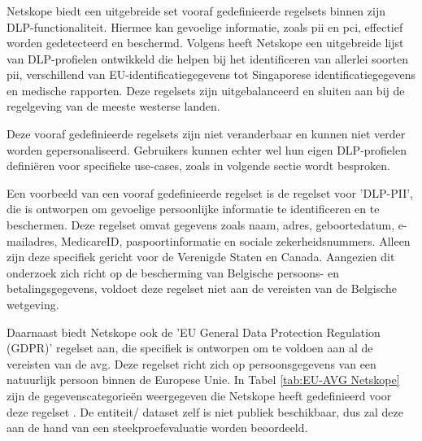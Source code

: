\subsubsection{}
\label{subsubsec:vooraf-gedefinieerde-regels-literatuurstudie}

Netskope biedt een uitgebreide set vooraf gedefinieerde regelsets binnen zijn DLP-functionaliteit. 
Hiermee kan gevoelige informatie, zoals \gls{pii} en \gls{pci}, effectief worden gedetecteerd en beschermd.
Volgens \textcite{brouwer2021cloud} heeft Netskope een uitgebreide lijst van DLP-profielen ontwikkeld die helpen bij het identificeren van allerlei soorten \gls{pii},
verschillend van EU-identificatiegegevens tot Singaporese identificatiegegevens en medische rapporten. 
Deze regelsets zijn uitgebalanceerd en sluiten aan bij de regelgeving van de meeste westerse landen. 

Deze vooraf gedefinieerde regelsets zijn niet veranderbaar en kunnen niet verder worden gepersonaliseerd. 
Gebruikers kunnen echter wel hun eigen DLP-profielen definiëren voor specifieke use-cases, zoals in volgende sectie wordt besproken. 

Een voorbeeld van een vooraf gedefinieerde regelset is de regelset voor 'DLP-PII', die is ontworpen om gevoelige persoonlijke informatie te identificeren en te beschermen. 
Deze regelset omvat gegevens zoals naam, adres, geboortedatum, e-mailadres, MedicareID, paspoortinformatie en sociale zekerheidsnummers. Alleen zijn deze specifiek gericht voor de Verenigde Staten en Canada. 
Aangezien dit onderzoek zich richt op de bescherming van Belgische persoons\-- en betalingsgegevens, voldoet deze regelset niet aan de vereisten van de Belgische wetgeving.

Daarnaast biedt Netskope ook de 'EU General Data Protection Regulation (GDPR)' regelset aan, die specifiek is ontworpen om te voldoen aan al de vereisten van de \gls{avg}. 
Deze regelset richt zich op persoonsgegevens van een natuurlijk persoon binnen de Europese Unie. 
In Tabel \ref{tab:EU-AVG Netskope} zijn de gegevenscategorieën weergegeven die Netskope heeft gedefinieerd voor deze regelset \autocite{Netskope2023GDPR}. 
De entiteit/ dataset zelf is niet publiek beschikbaar, dus zal deze aan de hand van een steekproefevaluatie worden beoordeeld. 

